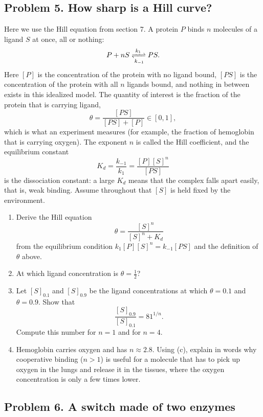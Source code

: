 \documentclass[a4paper,12pt]{article}
\begin{document}
\subsection*{Problem 5. How sharp is a Hill curve?}

Here we use the Hill equation from section 7. A protein $P$ binds $n$ molecules of a ligand $S$ at once, all or nothing:
\[ P + nS \xrightleftharpoons[k_{-1}]{k_1} PS . \]
Here $[P]$ is the concentration of the protein with no ligand bound, $[PS]$ is the concentration of the protein with all $n$ ligands bound, and nothing in between exists in this idealized model. The quantity of interest is the fraction of the protein that is carrying ligand,
\[ \theta = \frac{[PS]}{[PS]+[P]} \in [0,1] , \]
which is what an experiment measures (for example, the fraction of hemoglobin that is carrying oxygen). The exponent $n$ is called the Hill coefficient, and the equilibrium constant
\[ K_d = \frac{k_{-1}}{k_1} = \frac{[P][S]^n}{[PS]} \]
is the dissociation constant: a large $K_d$ means that the complex falls apart easily, that is, weak binding. Assume throughout that $[S]$ is held fixed by the environment.

\begin{enumerate}[label=(\alph*)]
\item Derive the Hill equation
\[ \theta = \frac{[S]^n}{[S]^n+K_d} \]
from the equilibrium condition $k_1[P][S]^n = k_{-1}[PS]$ and the definition of $\theta$ above.

\item At which ligand concentration is $\theta = \frac{1}{2}$?

\item Let $[S]_{0.1}$ and $[S]_{0.9}$ be the ligand concentrations at which $\theta = 0.1$ and $\theta = 0.9$. Show that
\[ \frac{[S]_{0.9}}{[S]_{0.1}} = 81^{1/n} . \]
Compute this number for $n=1$ and for $n=4$.

\item Hemoglobin carries oxygen and has $n \approx 2.8$. Using (c), explain in words why cooperative binding ($n>1$) is useful for a molecule that has to pick up oxygen in the lungs and release it in the tissues, where the oxygen concentration is only a few times lower.

\end{enumerate}

\subsection*{Problem 6. A switch made of two enzymes}
\end{document}
